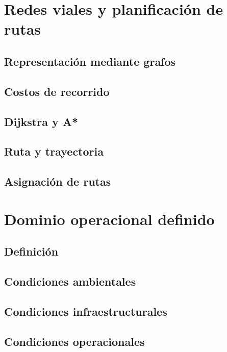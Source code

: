 \section{Redes viales y planificación de rutas}

\subsection{Representación mediante grafos}

\subsection{Costos de recorrido}

\subsection{Dijkstra y A*}

\subsection{Ruta y trayectoria}

\subsection{Asignación de rutas}

\section{Dominio operacional definido}

\subsection{Definición}

\subsection{Condiciones ambientales}

\subsection{Condiciones infraestructurales}

\subsection{Condiciones operacionales}

